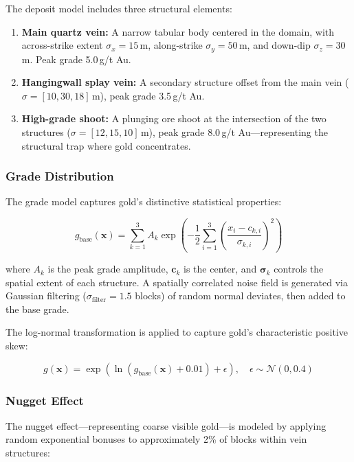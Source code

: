 \documentclass[12pt,a4paper]{article}
\begin{document}
The deposit model includes three structural elements:

\begin{enumerate}
    \item \textbf{Main quartz vein:} A narrow tabular body centered in the domain, with across-strike extent $\sigma_x = 15$\,m, along-strike $\sigma_y = 50$\,m, and down-dip $\sigma_z = 30$\,m. Peak grade 5.0\,g/t Au.
    \item \textbf{Hangingwall splay vein:} A secondary structure offset from the main vein ($\sigma = [10, 30, 18]$\,m), peak grade 3.5\,g/t Au.
    \item \textbf{High-grade shoot:} A plunging ore shoot at the intersection of the two structures ($\sigma = [12, 15, 10]$\,m), peak grade 8.0\,g/t Au---representing the structural trap where gold concentrates.
\end{enumerate}

\subsubsection{Grade Distribution}

The grade model captures gold's distinctive statistical properties:

\begin{equation}
    g_{\text{base}}(\mathbf{x}) = \sum_{k=1}^{3} A_k \exp\left(-\frac{1}{2} \sum_{i=1}^{3} \left(\frac{x_i - c_{k,i}}{\sigma_{k,i}}\right)^2 \right)
\end{equation}

where $A_k$ is the peak grade amplitude, $\mathbf{c}_k$ is the center, and $\boldsymbol{\sigma}_k$ controls the spatial extent of each structure. A spatially correlated noise field is generated via Gaussian filtering ($\sigma_{\text{filter}} = 1.5$ blocks) of random normal deviates, then added to the base grade.

The log-normal transformation is applied to capture gold's characteristic positive skew:

\begin{equation}
    g(\mathbf{x}) = \exp\left(\ln(g_{\text{base}}(\mathbf{x}) + 0.01) + \epsilon \right), \quad \epsilon \sim \mathcal{N}(0, 0.4)
\end{equation}

\subsubsection{Nugget Effect}

The nugget effect---representing coarse visible gold---is modeled by applying random exponential bonuses to approximately 2\% of blocks within vein structures:
\end{document}
